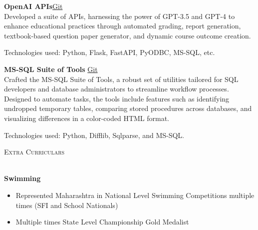 \documentclass[a4paper]{article}
\newcommand{\lineunder} {
\vspace*{-8pt} \\
\hspace*{-18pt} \hrulefill \\
}
\newcommand{\header} [1] {
{\hspace*{-18pt}\vspace*{6pt} \textsc{#1}}
\vspace*{-6pt} \lineunder
}
\begin{document}
{\textbf{OpenAI APIs}}\hfill \href{https://github.com/swarnimcodes/openai-gen-co-and-qp}{Git}\\
Developed a suite of APIs, harnessing the power of GPT-3.5 and GPT-4 to enhance educational practices 
through automated grading, report generation, textbook-based question paper generator, and 
dynamic course outcome creation. 

Technologies used: Python, Flask, FastAPI, PyODBC, MS-SQL, etc.\\
\vspace*{2mm}

{\textbf{MS-SQL Suite of Tools }}\hfill \href{https://github.com/swarnimcodes/Sequel}{Git}\\
Crafted the MS-SQL Suite of Tools, a robust set of utilities tailored for SQL developers 
and database administrators to streamline workflow processes. Designed to automate tasks, 
the tools include features such as identifying undropped temporary tables, comparing 
stored procedures across databases, and visualizing differences in a color-coded HTML format. 

Technologies used: Python, Difflib, Sqlparse, and MS-SQL.\\
\vspace*{2mm}

\vspace{2mm}
\header{Extra Curriculars}
\vspace{1mm}

\textbf{Swimming} 
\vspace{-1mm}
\begin{itemize} \itemsep 1pt
\item Represented Maharashtra in National Level Swimming Competitions multiple times (SFI and School Nationals)
\item Multiple times State Level Championship Gold Medalist
\end{itemize}
\end{document}
